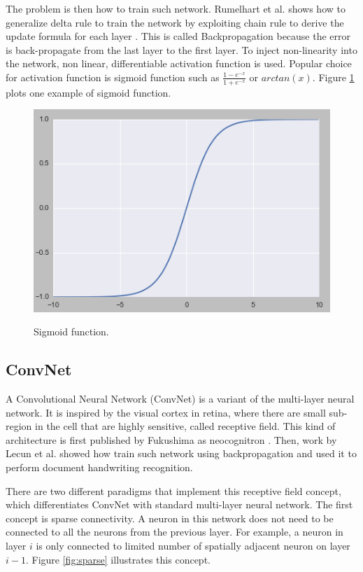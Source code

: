 \documentclass[a4paper,11pt]{kth-mag}
\begin{document}
The problem is then how to train such network. Rumelhart et al. shows how to generalize delta rule to train the network by exploiting chain rule to derive the update formula for each layer \cite{rumelhart}. This is called Backpropagation because the error is back-propagate from the last layer to the first layer. To inject non-linearity into the network, non linear, differentiable activation function is used. Popular choice for activation function is sigmoid function such as $\frac{1-e^{-x}}{1+e^{-x}}$ or $arctan(x)$. Figure \ref{fig:sigmoid} plots one example of sigmoid function.

\begin{figure}[h]
\centering
\includegraphics[scale=0.5]{image/sigmoid.png}
\label{fig:sigmoid}
\caption{Sigmoid function.}
\end{figure}

\subsection{ConvNet}
A Convolutional Neural Network (ConvNet) is a variant of the multi-layer neural network. It is inspired by the visual cortex in retina, where there are small sub-region in the cell that are highly sensitive, called receptive field. This kind of architecture is first published by Fukushima as neocognitron \cite{fukushima}. Then, work by Lecun et al. \cite{lecunn} showed how train such network using backpropagation and used it to perform document handwriting recognition.

There are two different paradigms that implement this receptive field concept, which differentiates ConvNet with standard multi-layer neural network. The first concept is sparse connectivity. A neuron in this network does not need to be connected to all the neurons from the previous layer. For example, a neuron in layer $i$ is only connected to limited number of spatially adjacent neuron on layer $i-1$. Figure \ref{fig:sparse} illustrates this concept.
\end{document}
